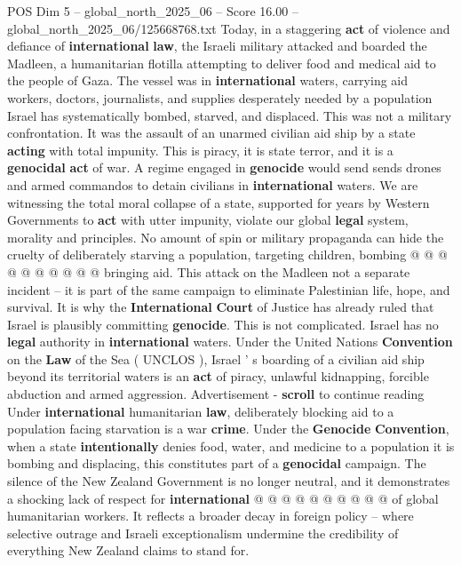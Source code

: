 \begin{textsample}{POS Dim 5 – global\_north\_2025\_06 – Score 16.00 – global\_north\_2025\_06/125668768.txt}  \label{ex:f5_pos_084}
Today, in a staggering \textbf{act} of violence and defiance of \textbf{international} \textbf{law}, the Israeli military attacked and boarded the Madleen, a humanitarian flotilla attempting to deliver food and medical aid to the people of Gaza.
The vessel was in \textbf{international} waters, carrying aid workers, doctors, journalists, and supplies desperately needed by a population Israel has systematically bombed, starved, and displaced.
This was not a military confrontation.
It was the assault of an unarmed civilian aid ship by a state \textbf{acting} with total impunity.
This is piracy, it is state terror, and it is a \textbf{genocidal} \textbf{act} of war.
A regime engaged in \textbf{genocide} would send sends drones and armed commandos to detain civilians in \textbf{international} waters.
We are witnessing the total moral collapse of a state, supported for years by Western Governments to \textbf{act} with utter impunity, violate our global \textbf{legal} system, morality and principles.
No amount of spin or military propaganda can hide the cruelty of deliberately starving a population, targeting children, bombing @ @ @ @ @ @ @ @ @ @ bringing aid.
This attack on the Madleen not a separate incident -- it is part of the same campaign to eliminate Palestinian life, hope, and survival.
It is why the \textbf{International} \textbf{Court} of Justice has already ruled that Israel is plausibly committing \textbf{genocide}.
This is not complicated.
Israel has no \textbf{legal} authority in \textbf{international} waters.
Under the United Nations \textbf{Convention} on the \textbf{Law} of the Sea ( UNCLOS ), Israel ' s boarding of a civilian aid ship beyond its territorial waters is an \textbf{act} of piracy, unlawful kidnapping, forcible abduction and armed aggression.
Advertisement - \textbf{scroll} to continue reading Under \textbf{international} humanitarian \textbf{law}, deliberately blocking aid to a population facing starvation is a war \textbf{crime}.
Under the \textbf{Genocide} \textbf{Convention}, when a state \textbf{intentionally} denies food, water, and medicine to a population it is bombing and displacing, this constitutes part of a \textbf{genocidal} campaign.
The silence of the New Zealand Government is no longer neutral, and it demonstrates a shocking lack of respect for \textbf{international} @ @ @ @ @ @ @ @ @ @ of global humanitarian workers.
It reflects a broader decay in foreign policy -- where selective outrage and Israeli exceptionalism undermine the credibility of everything New Zealand claims to stand for.

\end{textsample}
